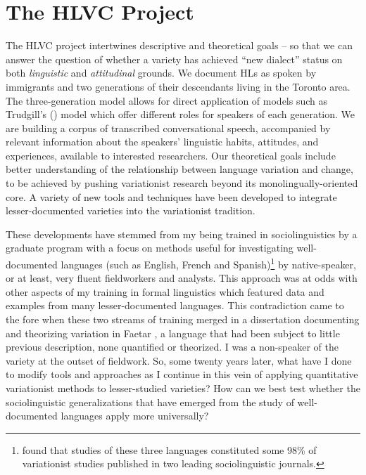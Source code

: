 \documentclass[output=paper]{LSP/langsci}
\begin{document}
\section{The HLVC Project}

The HLVC project intertwines descriptive and theoretical goals – so that we can answer the question of whether a variety has achieved “new dialect” status on both \textit{linguistic} and \textit{attitudinal} grounds. We document HLs as spoken by immigrants and two generations of their descendants living in the Toronto area. The three-generation model allows for direct application of models such as Trudgill’s (\citeyear{trudgill_dialects_1986}) model which offer different roles for speakers of each generation. We are building a corpus of transcribed conversational speech, accompanied by relevant information about the speakers’ linguistic habits, attitudes, and experiences, available to interested researchers. Our theoretical goals include better understanding of the relationship between language variation and change, to be achieved by pushing variationist research beyond its monolingually-oriented core. A variety of new tools and techniques have been developed to integrate lesser-documented varieties into the variationist tradition. 

These developments have stemmed from my being trained in sociolinguistics by a graduate program with a focus on methods useful for investigating well-documented languages (such as English, French and Spanish)\footnote{ \citet{nagy_love_2008} found that studies of these three languages constituted some 98\% of variationist studies published in two leading sociolinguistic journals.} by native-speaker, or at least, very fluent fieldworkers and analysts. This approach was at odds with other aspects of my training in formal linguistics which featured data and examples from many lesser-documented languages. This contradiction came to the fore when these two streams of training merged in a dissertation documenting and theorizing variation in Faetar \citep{nagy_language_1996}, a language that had been subject to little previous description, none quantified or theorized. I was a non-speaker of the variety at the outset of fieldwork. So, some twenty years later, what have I done to modify tools and approaches as I continue in this vein of applying quantitative variationist methods to lesser-studied varieties? How can we best test whether the sociolinguistic generalizations that have emerged from the study of well-documented languages apply more universally?
\end{document}
